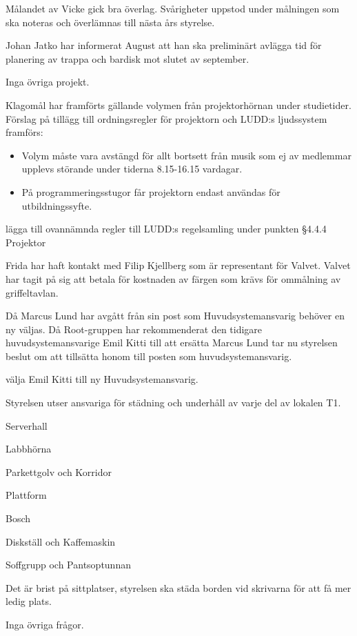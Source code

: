 \documentclass{protokoll}
\begin{document}
Målandet av Vicke gick bra överlag. Svårigheter uppstod under målningen som ska noteras och överlämnas till nästa års styrelse. 

Johan Jatko har informerat August att han ska preliminärt avlägga tid för planering av trappa och bardisk mot slutet av september.

Inga övriga projekt.

Klagomål har framförts gällande volymen från projektorhörnan under studietider. Förslag på tillägg till ordningsregler för projektorn och LUDD:s ljudssystem framförs: 
\begin{itemize}
	\item Volym måste vara avstängd för allt bortsett från musik som ej av medlemmar upplevs störande under tiderna 8.15-16.15 vardagar. 
	\item På programmeringsstugor får projektorn endast användas för utbildningssyfte.
\end{itemize}

\begin{beslut}
    \att lägga till ovannämnda regler till LUDD:s regelsamling under punkten §4.4.4 Projektor
\end{beslut}

Frida har haft kontakt med Filip Kjellberg som är representant för Valvet. Valvet har tagit på sig att betala för kostnaden av färgen som krävs för ommålning av griffeltavlan. 

Då Marcus Lund har avgått från sin post som Huvudsystemansvarig behöver en ny väljas. Då Root-gruppen har rekommenderat den tidigare huvudsystemansvarige Emil Kitti till att ersätta Marcus Lund tar nu styrelsen beslut om att tillsätta honom till posten som huvudsystemansvarig. 
\begin{beslut}
    \att välja Emil Kitti till ny Huvudsystemansvarig.
\end{beslut}

Styrelsen utser ansvariga för städning och underhåll av varje del av lokalen T1. 
\begin{description}[align=left]
    \item [Kitti] Serverhall 
    \item [Jens] Labbhörna
    \item [Frida] Parkettgolv och Korridor
    \item [Fredrik] Plattform
    \item [August] Bosch
    \item [Anton] Diskställ och Kaffemaskin
    \item [Edvin] Soffgrupp och Pantsoptunnan
\end{description}

Det är brist på sittplatser, styrelsen ska städa borden vid skrivarna för att få mer ledig plats.

Inga övriga frågor.
\end{document}
